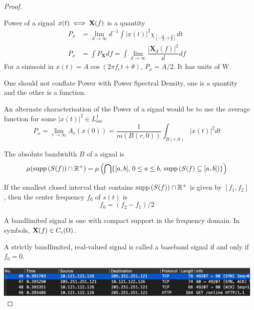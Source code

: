 \documentclass[../../main.tex]{subfiles}
\begin{document}
\begin{proof}
\begin{definition}
\end{definition}
\begin{definition}
    Power of a signal $x(t)\iff \bf{X}(f)$ is a quantity
    \begin{align*}
    P_x &= \lim_{d\to\infty}d^{-1}\int|x(t)|^2\chi_{\left[-\frac{d}{2},+\frac{d}{2}\right]}dt\\[2ex]
    P_x &= \int P_{\mathbf{X}}df = \int \lim_{d\to\infty}\dfrac{|\mathbf{X}_d(f)|^2}{d}df
    \end{align*}
    For a sinusoid in $x(t)=A\cos(2\pi f_c t+\theta)$, $P_x=A/2$. It has units of W.
\end{definition}
\begin{remark}
    One should not conflate Power with Power Spectral Density, one is a quantity and the other is a function.
\end{remark}
An alternate characterisation of the Power of a signal would be to use the average function for some $|x(t)|^2\in L^1_{loc}$
\[
P_x=\lim_{r\to\infty}A_r(x(0))=\dfrac{1}{m(B(r,0))}\int_{B(r,0)}|x(t)|^2dt
\]
\begin{definition}
    The absolute bandwidth $B$ of a signal is 
    \[
    \mu(\supp{S(f)}\cap\mathbb{R}^+)=\mu\left(\bigcap\{[a,b],\,0\leq a\leq b,\,\supp{S(f)\subseteq[a,b]}\}\right)
    \]
\end{definition}
\begin{definition}
    If the smallest closed interval that contains $\supp{S(f)}\cap\mathbb{R}^+$ is given by $[f_1,f_2]$, then the center frequency $f_0$ of $s(t)$ is
    \[
    f_0 = (f_2-f_1)/2
    \]
\end{definition}
\begin{definition}
    A bandlimited signal is one with compact support in the frequency domain. In symbols, $\xf\in C_c(\Omega)$.
\end{definition}
\begin{definition}
    A strictly bandlimited, real-valued signal is called a baseband signal if and only if $f_0=0$.
\end{definition}
\begin{wtr}

\end{wtr}
\includegraphics[width=\textwidth]{subfiles/images/ECSE_308_Lab_5_1_SUPA_PAGE1_0_Image27.png}
\end{proof}
\end{document}
